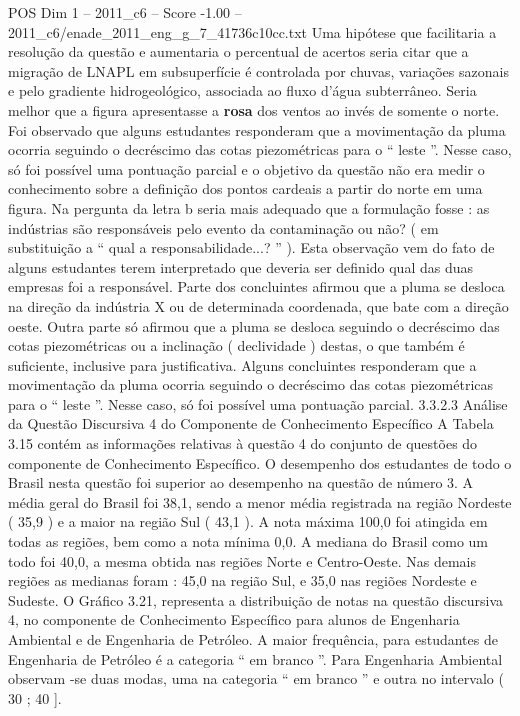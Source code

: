 \begin{textsample}{POS Dim 1 – 2011\_c6 – Score -1.00 – 2011\_c6/enade\_2011\_eng\_g\_7\_41736c10cc.txt}
Uma hipótese que facilitaria a resolução da questão e aumentaria o percentual de acertos seria citar que a migração de LNAPL em subsuperfície é controlada por chuvas, variações sazonais e pelo gradiente hidrogeológico, associada ao fluxo d’água subterrâneo.
Seria melhor que a figura apresentasse a \textbf{rosa} dos ventos ao invés de somente o norte.
Foi observado que alguns estudantes responderam que a movimentação da pluma ocorria seguindo o decréscimo das cotas piezométricas para o “ leste ”.
Nesse caso, só foi possível uma pontuação parcial e o objetivo da questão não era medir o conhecimento sobre a definição dos pontos cardeais a partir do norte em uma figura.
Na pergunta da letra b seria mais adequado que a formulação fosse : as indústrias são responsáveis pelo evento da contaminação ou não? ( em substituição a “ qual a responsabilidade...? ” ).
Esta observação vem do fato de alguns estudantes terem interpretado que deveria ser definido qual das duas empresas foi a responsável.
Parte dos concluintes afirmou que a pluma se desloca na direção da indústria X ou de determinada coordenada, que bate com a direção oeste.
Outra parte só afirmou que a pluma se desloca seguindo o decréscimo das cotas piezométricas ou a inclinação ( declividade ) destas, o que também é suficiente, inclusive para justificativa.
Alguns concluintes responderam que a movimentação da pluma ocorria seguindo o decréscimo das cotas piezométricas para o “ leste ”.
Nesse caso, só foi possível uma pontuação parcial. 3.3.2.3 Análise da Questão Discursiva 4 do Componente de Conhecimento Específico A Tabela 3.15 contém as informações relativas à questão 4 do conjunto de questões do componente de Conhecimento Específico.
O desempenho dos estudantes de todo o Brasil nesta questão foi superior ao desempenho na questão de número 3.
A média geral do Brasil foi 38,1, sendo a menor média registrada na região Nordeste ( 35,9 ) e a maior na região Sul ( 43,1 ).
A nota máxima 100,0 foi atingida em todas as regiões, bem como a nota mínima 0,0.
A mediana do Brasil como um todo foi 40,0, a mesma obtida nas regiões Norte e Centro-Oeste.
Nas demais regiões as medianas foram : 45,0 na região Sul, e 35,0 nas regiões Nordeste e Sudeste.
O Gráfico 3.21, representa a distribuição de notas na questão discursiva 4, no componente de Conhecimento Específico para alunos de Engenharia Ambiental e de Engenharia de Petróleo.
A maior frequência, para estudantes de Engenharia de Petróleo é a categoria “ em branco ”.
Para Engenharia Ambiental observam -se duas modas, uma na categoria “ em branco ” e outra no intervalo ( 30 ; 40 ].

\end{textsample}
